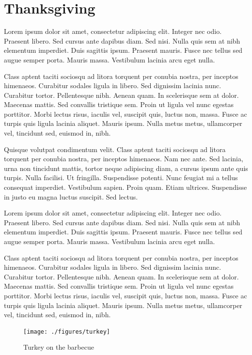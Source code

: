 \documentclass[12pt, draft]{book}
\begin{document}
\chapter{Thanksgiving}\label{chapter2}
Lorem ipsum dolor sit amet, consectetur adipiscing elit. Integer nec odio. Praesent libero. Sed cursus ante dapibus diam. Sed nisi. Nulla quis sem at nibh elementum imperdiet. Duis sagittis ipsum. Praesent mauris. Fusce nec tellus sed augue semper porta. Mauris massa. Vestibulum lacinia arcu eget nulla. 

Class aptent taciti sociosqu ad litora torquent per conubia nostra, per inceptos himenaeos. Curabitur sodales ligula in libero. Sed dignissim lacinia nunc. Curabitur tortor. Pellentesque nibh. Aenean quam. In scelerisque sem at dolor. Maecenas mattis. Sed convallis tristique sem. Proin ut ligula vel nunc egestas porttitor. Morbi lectus risus, iaculis vel, suscipit quis, luctus non, massa. Fusce ac turpis quis ligula lacinia aliquet. Mauris ipsum. Nulla metus metus, ullamcorper vel, tincidunt sed, euismod in, nibh. 


Quisque volutpat condimentum velit. Class aptent taciti sociosqu ad litora torquent per conubia nostra, per inceptos himenaeos. Nam nec ante. Sed lacinia, urna non tincidunt mattis, tortor neque adipiscing diam, a cursus ipsum ante quis turpis. Nulla facilisi. Ut fringilla. Suspendisse potenti. Nunc feugiat mi a tellus consequat imperdiet. Vestibulum sapien. Proin quam. Etiam ultrices. Suspendisse in justo eu magna luctus suscipit. Sed lectus. 

Lorem ipsum dolor sit amet, consectetur adipiscing elit. Integer nec odio. Praesent libero. Sed cursus ante dapibus diam. Sed nisi. Nulla quis sem at nibh elementum imperdiet. Duis sagittis ipsum. Praesent mauris. Fusce nec tellus sed augue semper porta. Mauris massa. Vestibulum lacinia arcu eget nulla. 

Class aptent taciti sociosqu ad litora torquent per conubia nostra, per inceptos himenaeos. Curabitur sodales ligula in libero. Sed dignissim lacinia nunc. Curabitur tortor. Pellentesque nibh. Aenean quam. In scelerisque sem at dolor. Maecenas mattis. Sed convallis tristique sem. Proin ut ligula vel nunc egestas porttitor. Morbi lectus risus, iaculis vel, suscipit quis, luctus non, massa. Fusce ac turpis quis ligula lacinia aliquet. Mauris ipsum. Nulla metus metus, ullamcorper vel, tincidunt sed, euismod in, nibh. 

\begin{figure}[t]
\begin{center}
\texttt{[image: ./figures/turkey]}
\end{center}
\caption*{Turkey on the barbecue}
\end{figure}
\clearpage

\newpage

\newpage

\newpage

\newpage

\newpage

\newpage


\end{document}
